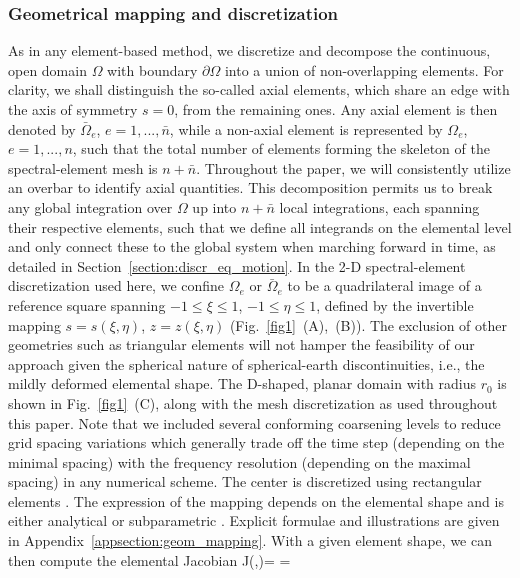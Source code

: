 \subsubsection{Geometrical mapping and discretization}\label{section:geometrical}
%
As in any element-based method, we discretize and decompose the continuous, 
open domain $\Omega$ with boundary $\partial\Omega$ 
into a union of non-overlapping elements. 
For clarity, we shall distinguish the so-called axial elements, which share an 
edge with the axis of symmetry $s=0$, from the remaining ones. Any axial 
element is then denoted by $\bar{\Omega}_{e}$, $e=1,...,\bar{n}$, 
while a non-axial element is represented by $\Omega_e$, $e=1,...,n$, such that 
the total number of elements forming the skeleton of the spectral-element 
mesh is $n+\bar{n}$.
Throughout the paper, we will consistently utilize an overbar to 
identify axial quantities. This decomposition permits us to break any global 
integration over $\Omega$ up into $n+\bar{n}$ local integrations, each 
spanning their respective elements, such that we define all integrands on 
the elemental level and only connect these to the global system when 
marching forward in time, as detailed in 
Section~\ref{section:discr_eq_motion}. 
In the 2-D spectral-element discretization used here, we confine $\Omega_e$ or 
$\bar{\Omega}_{e}$ to be a quadrilateral image of a reference square 
spanning $-1\le\xi\le 1$, $-1\le\eta\le 1$, defined by the invertible 
mapping $s=s(\xi,\eta)$, $z=z(\xi,\eta)$ (Fig.~\ref{fig1}~(A),~(B)). 
The exclusion of other geometries 
such as triangular elements will not hamper the feasibility of our approach 
given the spherical nature of spherical-earth discontinuities, i.e., the 
mildly deformed elemental shape. 
The D-shaped, planar domain with radius $r_0$ is shown in Fig.~\ref{fig1}~(C),
along with the mesh discretization as used throughout this paper.
Note that we included several conforming coarsening levels to 
reduce grid spacing variations \citep{KoTr02a} which generally trade 
off the time step (depending on the minimal spacing) with the frequency 
resolution (depending on the maximal spacing) in any numerical scheme. 
The center is discretized using rectangular elements \citep{manuthesis}.
The expression of the mapping depends on the elemental shape and is
either analytical or subparametric \citep{fournier04}. Explicit formulae and 
illustrations are given in Appendix~\ref{appsection:geom_mapping}.
With a given element shape, we can then compute the elemental Jacobian
\eq \label{eq:jacob}
{\mathcal J}(\xi,\eta)=
=
